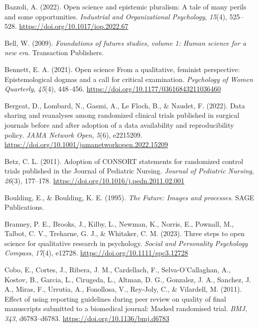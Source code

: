 \documentclass[authordate, meta]{jote-new-article}
\begin{document}
	Bazzoli, A. (2022). Open science and epistemic pluralism: A tale of many perils and some opportunities. \emph{Industrial and Organizational Psychology}, \emph{15}(4), 525--528. \url{https://doi.org/10.1017/iop.2022.67}



	Bell, W. (2009). \emph{Foundations of futures studies, volume 1: Human science for a new era}. Transaction Publishers.



	Bennett, E. A. (2021). Open science From a qualitative, feminist perspective: Epistemological dogmas and a call for critical examination. \emph{Psychology of Women Quarterly}, \emph{45}(4), 448--456. \url{https://doi.org/10.1177/03616843211036460}



	Bergeat, D., Lombard, N., Gasmi, A., Le Floch, B., \& Naudet, F. (2022). Data sharing and reanalyses among randomized clinical trials published in surgical journals before and after adoption of a data availability and reproducibility policy. \emph{JAMA Network Open}, \emph{5}(6), e2215209. \url{https://doi.org/10.1001/jamanetworkopen.2022.15209}



	Betz, C. L. (2011). Adoption of CONSORT statements for randomized control trials published in the Journal of Pediatric Nursing. \emph{Journal of Pediatric Nursing}, \emph{26}(3), 177--178. \url{https://doi.org/10.1016/j.pedn.2011.02.001}



	Boulding, E., \& Boulding, K. E. (1995). \emph{The Future: Images and processes}. SAGE Publications.



	Branney, P. E., Brooks, J., Kilby, L., Newman, K., Norris, E., Pownall, M., Talbot, C. V., Treharne, G. J., \& Whitaker, C. M. (2023). Three steps to open science for qualitative research in psychology. \emph{Social and Personality Psychology Compass}, \emph{17}(4), e12728. \url{https://doi.org/10.1111/spc3.12728}



	Cobo, E., Cortes, J., Ribera, J. M., Cardellach, F., Selva-O'Callaghan, A., Kostov, B., Garcia, L., Cirugeda, L., Altman, D. G., Gonzalez, J. A., Sanchez, J. A., Miras, F., Urrutia, A., Fonollosa, V., Rey-Joly, C., \& Vilardell, M. (2011). Effect of using reporting guidelines during peer review on quality of final manuscripts submitted to a biomedical journal: Masked randomised trial. \emph{BMJ}, \emph{343}, d6783--d6783. \url{https://doi.org/10.1136/bmj.d6783}
\end{document}

